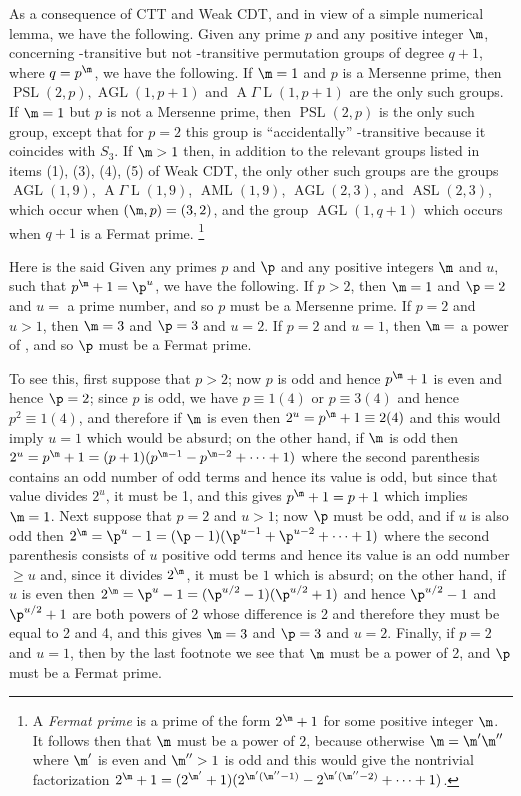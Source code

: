 As a consequence of CTT and Weak CDT, and in view of a 
simple numerical
lemma, we have the following.
{}
Given any prime $p$ and any positive integer $\m$, 
concerning
-transitive but not -transitive permutation groups 
of degree $q + 1$, 
where $q = p^{\m}$, we have the following. 
If $\m = 1$ and $p$ is a Mersenne prime, 
then $\operatorname{PSL}(2,p), \operatorname{AGL}(1,p+1)$ 
and 
$\operatorname{A}\Gamma\operatorname{L}(1,p+1)$ are the 
only such groups. If $\m = 1$ but $p$ is not a Mersenne 
prime, then $\operatorname{PSL}(2,p)$ is the only such 
group, except that for $p=2$ this 
group is ``accidentally'' -transitive because it 
coincides with $S_3$. If 
$\m > 1$ then, in addition to the relevant groups listed 
in items {\rm(1), 
(3), (4), (5)} of Weak CDT, the only other such groups are 
the groups
$\operatorname{AGL}(1,9)$, 
$\operatorname{A}\Gamma\operatorname{L}(1,9)$,
$\operatorname{AML}(1,9)$, 
$\operatorname{AGL}(2,3)$, and $\operatorname{ASL}(2,3)$, 
which occur when $(\m,p)=(3,2)$,
and the group $\operatorname{AGL}(1,q+1)$ which occurs 
when $q+1$ is a Fermat prime.
\footnote{A {\it Fermat prime} is a prime of the form 
$2^{\m}+1$ for some 
positive integer $\m$. It follows then that $\m$ must be a 
power of $2$,
because otherwise $\m=\m'\m''$ where $\m'$ is even and 
$\m''>1$ is odd and
this would give the nontrivial factorization
$2^{\m}+1=(2^{\m'}+1)(2^{\m'(\m''-1)}-2^{\m'(\m''-2)}+
\dots+1)$.}  
\ethm

Here is the said 
Given any primes $p$ and $\p$ and any positive integers 
$\m$ and $u$,
such that $p^{\m}+1=\p^u$, we have the following. If 
$p>2$, then $\m=1$ and
$\p=2$ and $u=$ a prime number, and so $p$ must be a 
Mersenne prime.
If $p=2$ and $u>1$, then $\m=3$ and $\p=3$ and $u=2$. If 
$p=2$ and $u=1$, then
$\m=$ a power of , and so $\p$ must be a Fermat prime.
\endproclaim

To see this, first suppose that $p>2$; now $p$ is odd and 
hence $p^{\m}+1$
is even and hence $\p=2$; since $p$ is odd, we have 
$p\equiv 1(4)$ or
$p\equiv 3(4)$ and hence $p^2\equiv 1(4)$, and therefore 
if $\m$ is even then
$2^u=p^{\m}+1\equiv 2(4)$ and this would imply $u=1$ which 
would be 
absurd; on the other hand, if $\m$ is odd then
$2^u=p^{\m}+1=(p+1)(p^{\m-1}-p^{\m-2}+\dots+1)$ where the 
second parenthesis
contains an odd number of odd terms and hence its value is 
odd, but since
that value divides $2^u$, it must be 1, and this gives 
$p^{\m}+1=p+1$ 
which implies $\m=1$.
Next suppose that $p=2$ and $u>1$; now $\p$ must be odd, 
and if $u$ is
also odd then $2^{\m}=\p^u-1=(\p-1)(\p^{u-1}+\p^{u-2}+
\dots+1)$ where the
second parenthesis consists of $u$ positive odd terms and 
hence its value is
an odd number $\ge u$ and, since it divides $2^{\m}$, it 
must be $1$ which is
absurd; on the other hand, if $u$ is even then 
$2^{\m}=\p^u-1=(\p^{u/2}-1)(\p^{u/2}+1)$ and hence
$\p^{u/2}-1$ and $\p^{u/2}+1$ are both powers of 2 whose 
difference
is 2 and therefore they must be equal to 2 and 4, and this 
gives
$\m=3$ and $\p=3$ and $u=2$. Finally, if $p=2$ and $u=1$, 
then by the last
footnote we see that $\m$ must be a power of 2, and $\p$ 
must be a Fermat prime.

